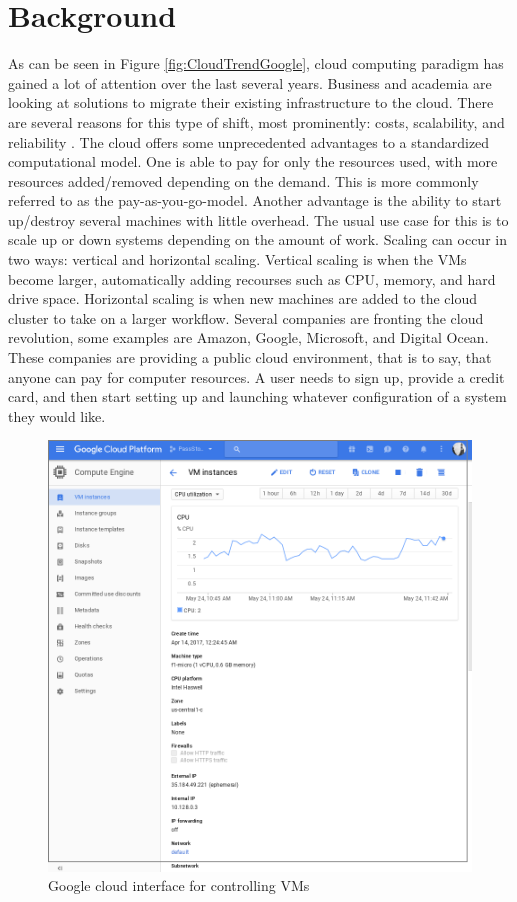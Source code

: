 \documentclass[12pt]{article}
\begin{document}
\section{Background}
As can be seen in Figure \ref{fig:CloudTrendGoogle}, cloud computing paradigm has gained a lot of attention over the last several years. Business and academia are looking at solutions to migrate their existing infrastructure to the cloud. There are several reasons for this type of shift, most prominently: costs, scalability, and reliability \cite{DillonWuChang}. The cloud offers some unprecedented advantages to a standardized computational model. One is able to pay for only the resources used, with more resources added/removed depending on the demand. This is more commonly referred to as the pay-as-you-go-model. Another advantage is the ability to start up/destroy several machines with little overhead. The usual use case for this is to scale up or down systems depending on the amount of work. Scaling can occur in two ways: vertical and horizontal scaling. Vertical scaling is when the VMs become larger, automatically adding recourses such as CPU, memory, and hard drive space. Horizontal scaling is when new machines are added to the cloud cluster to take on a larger workflow. Several companies are fronting the cloud revolution, some examples are Amazon\cite{amazonaws2017}, Google\cite{GoogleCloudCompute2017}, Microsoft\cite{Azure2017}, and Digital Ocean\cite{DigitalOcian2017}. These companies are providing a public cloud environment, that is to say, that anyone can pay for computer resources. A user needs to sign up, provide a credit card, and then start setting up and launching whatever configuration of a system they would like.
\begin{figure}[ht]
    \centering
    \includegraphics[scale=.3]{./pic/2017-05-24-114324_946x962_scrot.png}
    \caption{Google cloud interface for controlling VMs}
    \label{fig:GoogleInterface}
\end{figure}
\end{document}
